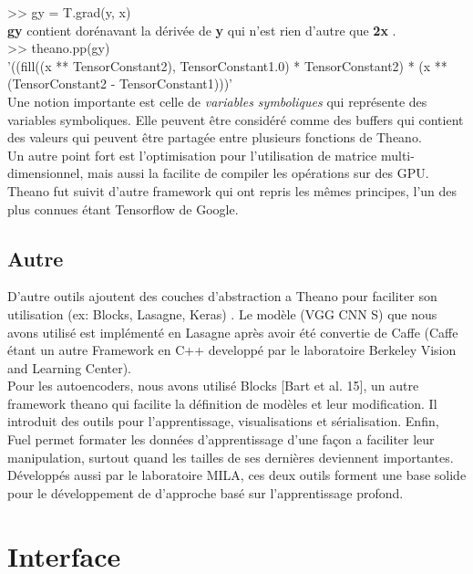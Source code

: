>> gy = T.grad(y, x)\\

\textbf{gy} contient dorénavant la dérivée de \textbf{y} qui n'est rien d'autre que \textbf{2x} .\\

>> theano.pp(gy)\\
 '((fill((x ** TensorConstant{2}), TensorConstant{1.0}) * TensorConstant{2}) * (x ** (TensorConstant{2} - TensorConstant{1})))'\\
 

Une notion importante est celle de \textit{variables symboliques} qui représente des variables symboliques. Elle peuvent être considéré comme des buffers qui contient des valeurs qui peuvent être partagée entre plusieurs fonctions de Theano.\\

Un autre point fort est l'optimisation pour l'utilisation de matrice multi-dimensionnel, mais aussi la facilite de compiler les opérations sur des GPU.\\

Theano fut suivit d'autre framework qui ont repris les mêmes principes, l'un des plus connues étant Tensorflow de Google.

\subsection{Autre}
D'autre outils ajoutent des couches d'abstraction a Theano pour faciliter son utilisation (ex: Blocks, Lasagne, Keras) .
Le modèle (VGG CNN S) que nous avons utilisé est implémenté en Lasagne après avoir été convertie de Caffe (Caffe étant un autre Framework en C++ developpé par le laboratoire Berkeley Vision and Learning Center).\\

Pour les autoencoders, nous avons utilisé Blocks [Bart et al. 15], un autre framework theano qui facilite la définition de modèles et leur modification. Il introduit des outils pour l'apprentissage, visualisations et sérialisation. Enfin, Fuel permet formater les données d'apprentissage d'une façon a faciliter leur manipulation, surtout quand les tailles de ses dernières deviennent importantes.
Développés aussi par le laboratoire MILA, ces deux outils forment une base solide pour le développement de d’approche basé sur l'apprentissage profond.

\section{Interface}


